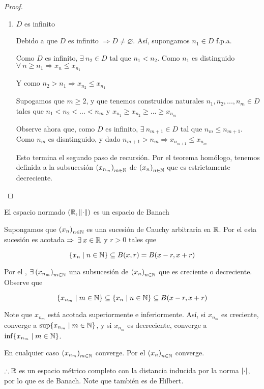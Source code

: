 \begin{proof}
\begin{enumerate}
        \item $D$ es infinito

        Debido a que $D$ es infinito $\Rightarrow D \neq \varnothing$. Así, supongamos $n_1 \in D$ f.p.a.

        Como $D$ es infinito, $\exists \: n_2 \in D$ tal que $n_1 < n_2$. Como $n_1$ es distinguido $\forall \: n \geqslant n_1 \Rightarrow x_n \leqslant x_{n_1}$

        Y como $n_2 > n_1 \Rightarrow  x_{n_2} \leqslant  x_{n_1}$

        Supogamos que $m \geqslant 2$, y que tenemos construidos naturales $n_1, n_2, ..., n_m \in D$ tales que $n_1 < n_2 <  ... < n_m$ y $ x_{n_1} \geqslant  x_{n_2} \geqslant ... \geqslant x_{n_m}$

        Observe ahora que, como $D$ es infinito, $\exists \: n_{m+1} \in D$ tal que $n_m \leqslant n_{m+1}$. Como $n_m$ es disntinguido, y dado  $n_{m+1} > n_m \Rightarrow  x_{n_{m + 1}} \leqslant x_{n_m}$

        Esto termina el segundo paso de recursión. Por el teorema homólogo, tenemos definida a la subsucesión ${\left( x_{n_m}\right)}_{m \in \mathbb{N}}$ de ${\left( x_n\right)}_{n \in \mathbb{N}}$ que es estrictamente decreciente. 
        
    \end{enumerate}
\end{proof}

\begin{eg} \label{eg411}
    El espacio normado $(\mathbb{R}, \norm{\cdot})$ es un espacio de Banach
\end{eg}

\begin{proofexplanation}
    Supongamos que ${\left( x_n\right)}_{n \in \mathbb{N}}$ es una sucesión de Cauchy arbitraria en $\mathbb{R}$. Por el  esta sucesión es acotada $\Rightarrow \: \exists \: x \in \mathbb{R}$ y $r > 0$ tales que

    $$\{ x_n \mid n \in \mathbb{N} \} \subseteq B(x,r) = B(x-r, x + r)$$

    Por el , $\exists \: {\left( x_{n_m}\right)}_{m \in \mathbb{N}}$ una subsucesión de ${\left( x_n\right)}_{n \in \mathbb{N}}$ que es creciente o decreciente. Observe que

    $$\{ x_{n_m} \mid m \in \mathbb{N} \} \subseteq \{ x_n \mid n \in \mathbb{N} \}  \subseteq  B(x-r, x + r)$$

    Note que $x_{n_m}$ está acotada superiormente e inferiormente. Así, si $x_{n_m}$ es creciente, converge a $\sup \{ x_{n_m} \mid m \in \mathbb{N} \}$, y si $x_{n_m}$ es decreciente, converge a $\inf \{ x_{n_m} \mid m \in \mathbb{N} \}$.

    En cualquier caso ${\left( x_{n_m} \right)}_{m \in \mathbb{N}}$ converge. Por el  ${\left( x_n\right)}_{n \in \mathbb{N}}$ converge. 

    $\therefore \mathbb{R}$ es un espacio métrico completo con la distancia inducida por la norma $\abs{\cdot}$, por lo que es de Banach. Note que también es de Hilbert. 
\end{proofexplanation}

